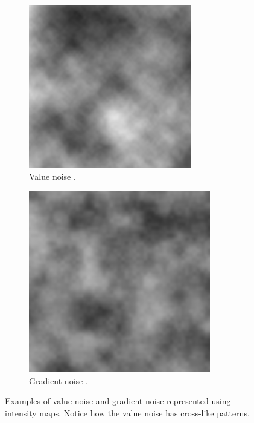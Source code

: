 \begin{figure}[h!]
  \centering
  \begin{subfigure}[b]{0.30\textwidth}
    \includegraphics[width=\textwidth]{figure/value_noise.png}
    \caption{Value noise \cite{value_noise_img}.}
  \end{subfigure}
  \quad
  \quad
  \quad
  \begin{subfigure}[b]{0.30\textwidth}
    \includegraphics[width=\textwidth]{figure/perlin_noise.png}
    \caption{Gradient noise \cite{perlin_noise_img}.}
  \end{subfigure}

  \caption{Examples of value noise and gradient noise represented using intensity maps. Notice how the value noise has cross-like patterns.}
  \label{fig:noisetypes}
\end{figure}

